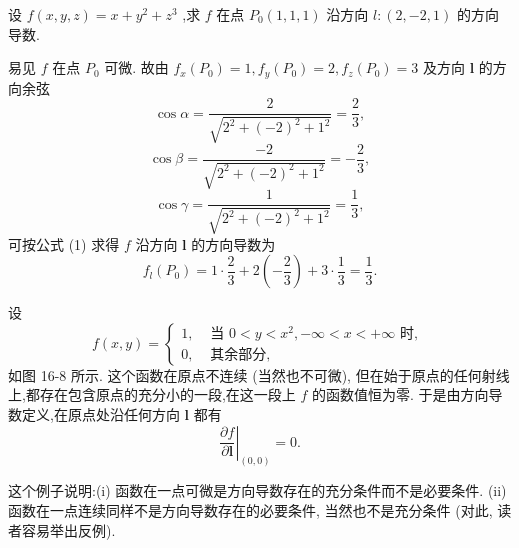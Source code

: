 \begin{example}

\end{example}
设 \(f\left( {x,y,z}\right)  = x + {y}^{2} + {z}^{3}\) ,求 \(f\) 在点 \({P}_{0}\left( {1,1,1}\right)\) 沿方向 \(l : \left( {2, - 2,1}\right)\) 的方向导数.

\begin{solution}

\end{solution}
易见 \(f\) 在点 \({P}_{0}\) 可微. 故由 \({f}_{x}\left( {P}_{0}\right)  = 1,{f}_{y}\left( {P}_{0}\right)  = 2,{f}_{z}\left( {P}_{0}\right)  = 3\) 及方向 \(\mathbf{l}\) 的方向余弦
\[
\cos \alpha  = \frac{2}{\sqrt{{2}^{2} + {\left( -2\right) }^{2} + {1}^{2}}} = \frac{2}{3},
\]
\[
\cos \beta  = \frac{-2}{\sqrt{{2}^{2} + {\left( -2\right) }^{2} + {1}^{2}}} =  - \frac{2}{3},
\]
\[
\cos \gamma  = \frac{1}{\sqrt{{2}^{2} + {\left( -2\right) }^{2} + {1}^{2}}} = \frac{1}{3},
\]
可按公式 (1) 求得 \(f\) 沿方向 \(\mathbf{l}\) 的方向导数为
\[
{f}_{l}\left( {P}_{0}\right)  = 1 \cdot  \frac{2}{3} + 2\left( {-\frac{2}{3}}\right)  + 3 \cdot  \frac{1}{3} = \frac{1}{3}.
\]
\begin{example}

\end{example}
设
\[
f\left( {x,y}\right)  = \left\{  \begin{array}{ll} 1, & \text{ 当 }0 < y < {x}^{2}, - \infty  < x <  + \infty \text{ 时, } \\  0, & \text{ 其余部分, } \end{array}\right.
\]
如图 16-8 所示. 这个函数在原点不连续 (当然也不可微), 但在始于原点的任何射线上,都存在包含原点的充分小的一段,在这一段上 \(f\) 的函数值恒为零. 于是由方向导数定义,在原点处沿任何方向 \(\mathbf{l}\) 都有
\[
{\left. \frac{\partial f}{\partial \mathbf{l}}\right| }_{\left( 0,0\right) } = 0.
\]


这个例子说明:(i) 函数在一点可微是方向导数存在的充分条件而不是必要条件. (ii) 函数在一点连续同样不是方向导数存在的必要条件, 当然也不是充分条件 (对此, 读者容易举出反例).

